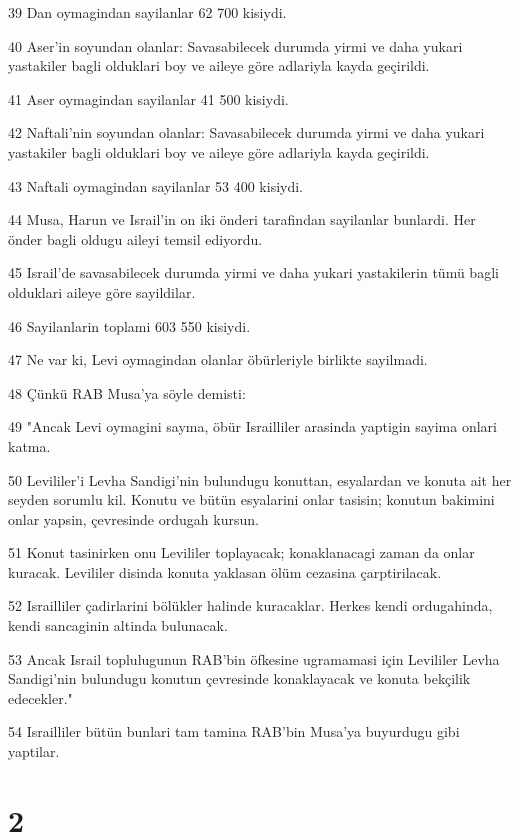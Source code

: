 \par 39 Dan oymagindan sayilanlar 62 700 kisiydi.
\par 40 Aser'in soyundan olanlar: Savasabilecek durumda yirmi ve daha yukari yastakiler bagli olduklari boy ve aileye göre adlariyla kayda geçirildi.
\par 41 Aser oymagindan sayilanlar 41 500 kisiydi.
\par 42 Naftali'nin soyundan olanlar: Savasabilecek durumda yirmi ve daha yukari yastakiler bagli olduklari boy ve aileye göre adlariyla kayda geçirildi.
\par 43 Naftali oymagindan sayilanlar 53 400 kisiydi.
\par 44 Musa, Harun ve Israil'in on iki önderi tarafindan sayilanlar bunlardi. Her önder bagli oldugu aileyi temsil ediyordu.
\par 45 Israil'de savasabilecek durumda yirmi ve daha yukari yastakilerin tümü bagli olduklari aileye göre sayildilar.
\par 46 Sayilanlarin toplami 603 550 kisiydi.
\par 47 Ne var ki, Levi oymagindan olanlar öbürleriyle birlikte sayilmadi.
\par 48 Çünkü RAB Musa'ya söyle demisti:
\par 49 "Ancak Levi oymagini sayma, öbür Israilliler arasinda yaptigin sayima onlari katma.
\par 50 Levililer'i Levha Sandigi'nin bulundugu konuttan, esyalardan ve konuta ait her seyden sorumlu kil. Konutu ve bütün esyalarini onlar tasisin; konutun bakimini onlar yapsin, çevresinde ordugah kursun.
\par 51 Konut tasinirken onu Levililer toplayacak; konaklanacagi zaman da onlar kuracak. Levililer disinda konuta yaklasan ölüm cezasina çarptirilacak.
\par 52 Israilliler çadirlarini bölükler halinde kuracaklar. Herkes kendi ordugahinda, kendi sancaginin altinda bulunacak.
\par 53 Ancak Israil toplulugunun RAB'bin öfkesine ugramamasi için Levililer Levha Sandigi'nin bulundugu konutun çevresinde konaklayacak ve konuta bekçilik edecekler."
\par 54 Israilliler bütün bunlari tam tamina RAB'bin Musa'ya buyurdugu gibi yaptilar.

\chapter{2}

